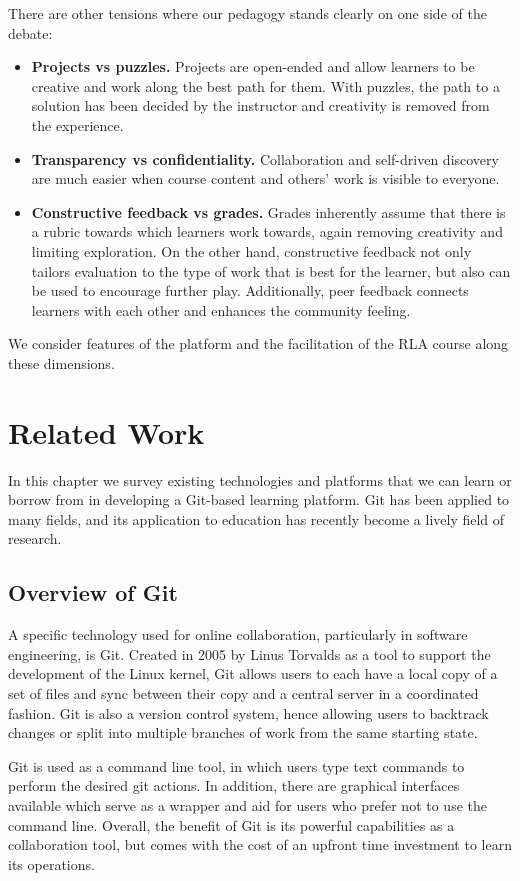 \documentclass[12pt,twoside,vi]{mitthesis}
\begin{document}
There are other tensions where our pedagogy stands clearly on one side of the debate:
\begin{itemize}
\item \textbf{Projects vs puzzles.} Projects are open-ended and allow learners to be creative and work along the best path for them. With puzzles, the path to a solution has been decided by the instructor and creativity is removed from the experience.
\item \textbf{Transparency vs confidentiality.} Collaboration and self-driven discovery are much easier when course content and others' work is visible to everyone.
\item \textbf{Constructive feedback vs grades.} Grades inherently assume that there is a rubric towards which learners work towards, again removing creativity and limiting exploration. On the other hand, constructive feedback not only tailors evaluation to the type of work that is best for the learner, but also can be used to encourage further play. Additionally, peer feedback connects learners with each other and enhances the community feeling.
\end{itemize}
We consider features of the platform and the facilitation of the RLA course along these dimensions.

\chapter{Related Work}

In this chapter we survey existing technologies and platforms that we can learn or borrow from in developing a Git-based learning platform. Git has been applied to many fields, and its application to education has recently become a lively field of research. 

\section{Overview of Git}

A specific technology used for online collaboration, particularly in software engineering, is Git. Created in 2005 by Linus Torvalds as a tool to support the development of the Linux kernel, Git allows users to each have a local copy of a set of files and sync between their copy and a central server in a coordinated fashion. Git is also a version control system, hence allowing users to backtrack changes or split into multiple branches of work from the same starting state.

Git is used as a command line tool, in which users type text commands to perform the desired git actions. In addition, there are graphical interfaces available which serve as a wrapper and aid for users who prefer not to use the command line. Overall, the benefit of Git is its powerful capabilities as a collaboration tool, but comes with the cost of an upfront time investment to learn its operations.~\cite{githistory}
\end{document}
